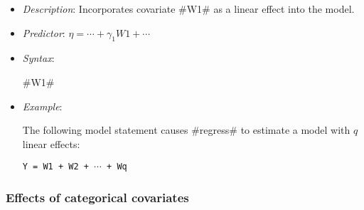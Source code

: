 \begin{itemize}
\item[] {\em Description}: Incorporates covariate #W1# as a linear effect into the model.
\item[] {\em Predictor}: $\eta =  \cdots + \gamma_1 W1 + \cdots$
\item[] {\em Syntax}:

#W1#
\item[] {\em Example}:

The following model statement causes #regress# to estimate a model
with $q$ linear effects:

\texttt{Y = W1 + W2 + $\cdots$ + Wq}
\end{itemize}

\subsubsection*{Effects of categorical covariates}

